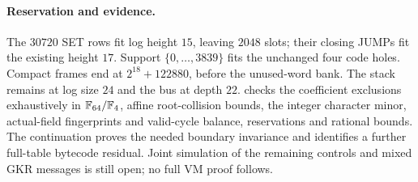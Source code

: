 \paragraph{Reservation and evidence.} The $30720$ SET rows fit log height $15$, leaving $2048$ slots; their closing JUMPs fit the existing height $17$. Support $\{0,\ldots,3839\}$ fits the unchanged four code holes. Compact frames end at $2^{18}+122880$, before the unused-word bank. The stack remains at log size $24$ and the bus at depth $22$.  checks the coefficient exclusions exhaustively in $\mathbb{F}_{64}/\mathbb{F}_4$, affine root-collision bounds, the integer character minor, actual-field fingerprints and valid-cycle balance, reservations and rational bounds. The continuation  proves the needed boundary invariance and identifies a further full-table bytecode residual. Joint simulation of the remaining controls and mixed GKR messages is still open; no full VM proof follows.
